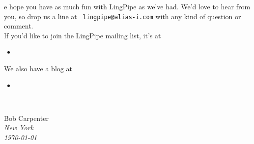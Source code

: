 \clearpage
\fancyhead{}
\fancyfoot{}
\pagestyle{fancy}


\thispagestyle{plain}

e hope you have as much fun with LingPipe as we've had.
We'd love to hear from you, so drop us a line at {\tt
lingpipe@alias-i.com} with any kind of question or comment.
\\[12pt]
If you'd like to join the LingPipe mailing list, it's at
\begin{itemize}
\item
{}
\end{itemize}
%
We also have a blog at
\begin{itemize}
\item
{}
\end{itemize}



\newlength{\sigWidth}
\mbox{ }
\hfill
\parbox{\sigWidth}{
Bob Carpenter
\\[2pt]\small
\it New York
\\
\today}
